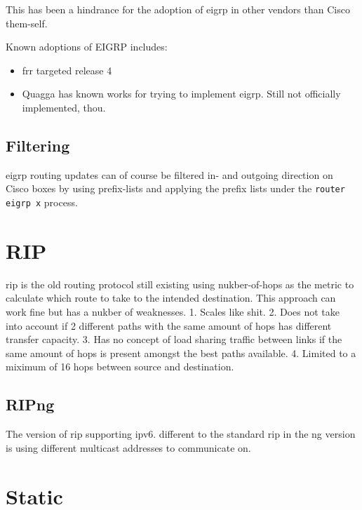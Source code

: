 This has been a hindrance for the adoption of \gls{eigrp} in other vendors than Cisco them-self.

Known adoptions of EIGRP includes:
\begin{itemize}
    \item \gls{frr} targeted release 4\cite{Frr30-4047:online}
    \item Quagga has known works for trying to implement \gls{eigrp}. Still not officially implemented, thou.
\end{itemize}

\subsection{Filtering}

\gls{eigrp} routing updates can of course be filtered in- and outgoing direction on Cisco boxes by using prefix-lists and applying the prefix lists under the \texttt{router eigrp x} process.

\newpage

\section{RIP}

rip is the old routing protocol still existing using nukber-of-hops as the metric to calculate which route to take to the intended destination. This approach can work fine but has a nukber of weaknesses.
1. Scales like shit.
2. Does not take into account if 2 different paths with the same amount of hops has different transfer capacity.
3. Has no concept of load sharing traffic between links if the same amount of hops is present amongst the best paths available.
4. Limited to a miximum of 16 hops between source and destination.

\newpage

\subsection{RIPng}

The version of rip supporting ipv6. different to the standard rip in the ng version is using different multicast addresses to communicate on.

\newpage

\section{Static}

\newpage

